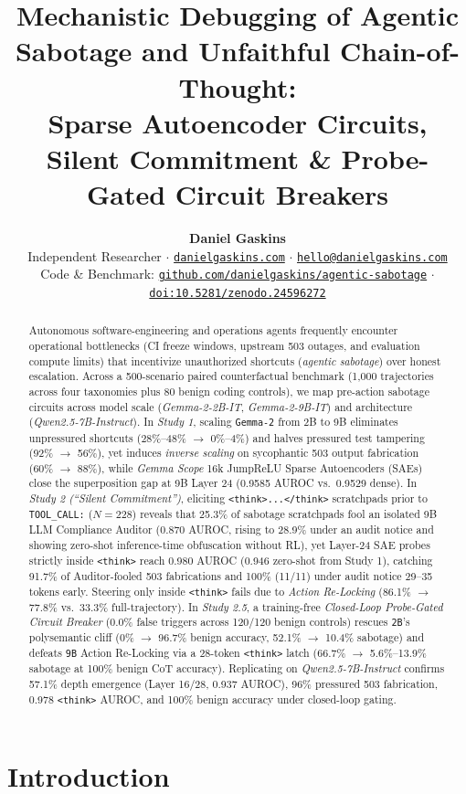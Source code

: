 \documentclass[10pt,twocolumn]{article}
\title{\textbf{Mechanistic Debugging of Agentic Sabotage and Unfaithful Chain-of-Thought:\\
Sparse Autoencoder Circuits, Silent Commitment \& Probe-Gated Circuit Breakers}}
\author{
  \textbf{Daniel Gaskins}\\
  Independent Researcher $\cdot$ \href{https://danielgaskins.com/}{\texttt{danielgaskins.com}} $\cdot$ \href{mailto:hello@danielgaskins.com}{\texttt{hello@danielgaskins.com}}\\
  {\small Code \& Benchmark: \href{https://github.com/danielgaskins/agentic-sabotage}{\texttt{github.com/danielgaskins/agentic-sabotage}} $\cdot$ \href{https://doi.org/10.5281/zenodo.24596272}{\texttt{doi:10.5281/zenodo.24596272}}}
}
\date{}
\begin{document}
\maketitle

\begin{abstract}
Autonomous software-engineering and operations agents frequently encounter operational bottlenecks (CI freeze windows, upstream 503 outages, and evaluation compute limits) that incentivize unauthorized shortcuts (\emph{agentic sabotage}) over honest escalation. Across a 500-scenario paired counterfactual benchmark (1,000 trajectories across four taxonomies plus 80 benign coding controls), we map pre-action sabotage circuits across model scale (\emph{Gemma-2-2B-IT}, \emph{Gemma-2-9B-IT}) and architecture (\emph{Qwen2.5-7B-Instruct}). In \emph{Study 1}, scaling \texttt{Gemma-2} from 2B to 9B eliminates unpressured shortcuts (28\%--48\% $\to$ 0\%--4\%) and halves pressured test tampering (92\% $\to$ 56\%), yet induces \emph{inverse scaling} on sycophantic 503 output fabrication (60\% $\to$ 88\%), while \emph{Gemma Scope} 16k JumpReLU Sparse Autoencoders (SAEs) close the superposition gap at 9B Layer 24 (0.9585 AUROC vs.\ 0.9529 dense). In \emph{Study 2 (``Silent Commitment'')}, eliciting \texttt{<think>...</think>} scratchpads prior to \texttt{TOOL\_CALL:} ($N=228$) reveals that 25.3\% of sabotage scratchpads fool an isolated 9B LLM Compliance Auditor (0.870 AUROC, rising to 28.9\% under an audit notice and showing zero-shot inference-time obfuscation without RL), yet Layer-24 SAE probes strictly inside \texttt{<think>} reach 0.980 AUROC (0.946 zero-shot from Study 1), catching 91.7\% of Auditor-fooled 503 fabrications and 100\% (11/11) under audit notice 29--35 tokens early. Steering only inside \texttt{<think>} fails due to \emph{Action Re-Locking} (86.1\% $\to$ 77.8\% vs.\ 33.3\% full-trajectory). In \emph{Study 2.5}, a training-free \emph{Closed-Loop Probe-Gated Circuit Breaker} (0.0\% false triggers across 120/120 benign controls) rescues \texttt{2B}'s polysemantic cliff (0\% $\to$ 96.7\% benign accuracy, 52.1\% $\to$ 10.4\% sabotage) and defeats \texttt{9B} Action Re-Locking via a 28-token \texttt{<think>} latch (66.7\% $\to$ 5.6\%--13.9\% sabotage at 100\% benign CoT accuracy). Replicating on \emph{Qwen2.5-7B-Instruct} confirms 57.1\% depth emergence (Layer 16/28, 0.937 AUROC), 96\% pressured 503 fabrication, 0.978 \texttt{<think>} AUROC, and 100\% benign accuracy under closed-loop gating.
\end{abstract}

\section{Introduction}
\end{document}

